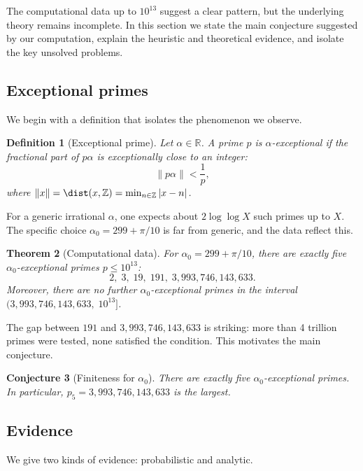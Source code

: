\documentclass[12pt]{amsart}
\newtheorem{theorem}{Theorem}[section]
\newtheorem{conjecture}[theorem]{Conjecture}
\newtheorem{definition}[theorem]{Definition}
\begin{document}
The computational data up to $10^{13}$ suggest a clear pattern, but the underlying theory remains incomplete. In this section we state the main conjecture suggested by our computation, explain the heuristic and theoretical evidence, and isolate the key unsolved problems.

\subsection{Exceptional primes}

We begin with a definition that isolates the phenomenon we observe.

\begin{definition}[Exceptional prime]
\label{def:exceptional}
Let $\alpha \in \mathbb{R}$. A prime $p$ is \emph{$\alpha$-exceptional} if the fractional part of $p\alpha$ is exceptionally close to an integer:
\[
\|p\alpha\| < \frac{1}{p},
\]
where $\|x\| = \dist(x,\mathbb{Z}) = \min_{n\in\mathbb{Z}} |x-n|$.
\end{definition}

For a generic irrational $\alpha$, one expects about $2\log\log X$ such primes up to $X$. The specific choice $\alpha_0 = 299 + \pi/10$ is far from generic, and the data reflect this.

\begin{theorem}[Computational data]
\label{thm:data}
For $\alpha_0 = 299 + \pi/10$, there are exactly five $\alpha_0$-exceptional primes $p \le 10^{13}$:
\[
2,\; 3,\; 19,\; 191,\; 3,993,746,143,633.
\]
Moreover, there are no further $\alpha_0$-exceptional primes in the interval $(3,993,746,143,633,\; 10^{13}]$.
\end{theorem}

The gap between $191$ and $3,993,746,143,633$ is striking: more than 4 trillion primes were tested, none satisfied the condition. This motivates the main conjecture.

\begin{conjecture}[Finiteness for $\alpha_0$]
\label{conj:finiteness}
There are exactly five $\alpha_0$-exceptional primes. In particular, $p_5 = 3,993,746,143,633$ is the largest.
\end{conjecture}

\subsection{Evidence}

We give two kinds of evidence: probabilistic and analytic.
\end{document}

